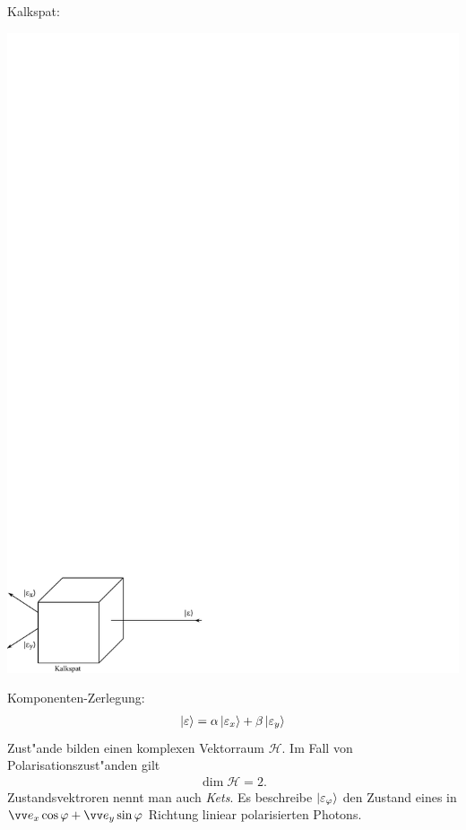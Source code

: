 \documentclass[a4paper]{scrartcl}
\begin{document}
{Kalkspat:
\begin{center}
\includegraphics{003Kalkspat2}
\end{center}
Komponenten-Zerlegung:
\begin{align}
\Ket{ \varepsilon } = \alpha \Ket{ \varepsilon_x } + \beta \Ket{ \varepsilon_y}
\end{align}
Zust"ande bilden einen komplexen Vektorraum $\mathcal H$. Im Fall von Polarisationszust"anden gilt 
\begin{align}
\dim \mathcal{H} = 2.
\end{align}Zustandsvektroren nennt man auch \emph{Kets}. Es beschreibe $\Ket{ \varepsilon_\varphi }$ den Zustand eines in $\vv e_x \cos \varphi + \vv e_y \sin \varphi$ Richtung liniear polarisierten Photons.
\begin{center}

\end{center}}
\end{document}
